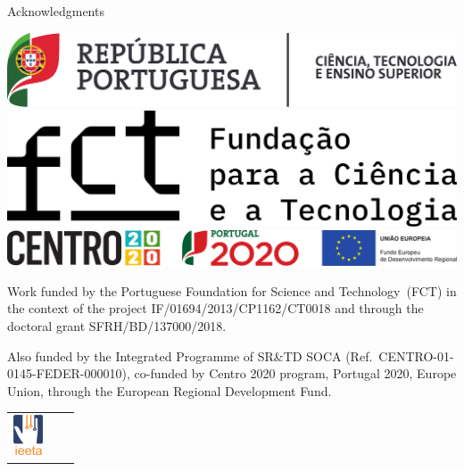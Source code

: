 \begin{frame}[t,plain]{Acknowledgments}

\begin{center}
\includegraphics[height=2.3\baselineskip]{img/logos/mctes.pdf}\hfill%
\includegraphics[height=2.3\baselineskip]{img/logos/fct.pdf}\\[16pt]%
\includegraphics[width=\linewidth]{img/logos/feder.pdf}%
\end{center}

\vspace*{2mm}

\linespread{1.3}\selectfont
\begingroup
\tiny
Work funded by the Portuguese Foundation for Science and Technology~(FCT) in the context of the project IF/01694/2013/CP1162/CT0018 and through the doctoral grant SFRH/BD/137000/2018.

\medskip

Also funded by the Integrated Programme of SR\&TD SOCA (Ref.\ CENTRO-01-0145-FEDER-000010), co-funded by Centro 2020 program, Portugal 2020, Europe Union, through the European Regional Development Fund.
\par\endgroup

\vspace*{5.4pt}

\begin{center}
\begin{tabular}{@{\hskip40pt}D{17.1mm}OD{22.0mm}}
\includegraphics[height=12mm]{img/logos/ieeta.png} &
\end{tabular}
\end{center}

\end{frame}

